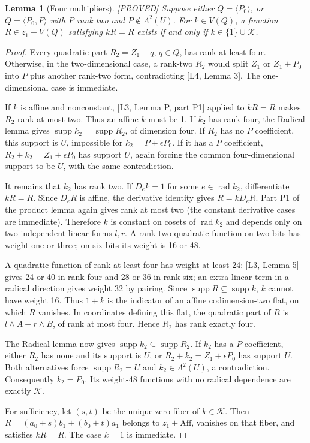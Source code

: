 \documentclass[11pt,a4paper]{article}
\newtheorem{lemma}[theorem]{Lemma}
\newcommand{\Aff}{\mathrm{Aff}}
\newcommand{\supp}{\operatorname{supp}}
\newcommand{\rad}{\operatorname{rad}}
\newcommand{\status}[1]{\hfill\textsf{[#1]}}
\begin{document}
\begin{lemma}[Four multipliers]\label{lem:four}\status{PROVED}
Suppose either $Q=\langle P_0\rangle$, or $Q=\langle P_0,P\rangle$ with $P$ rank two and $P\notin\Lambda^2(U)$. For $k\in V(Q)$, a function $R\in z_1+V(Q)$ satisfying $kR=R$ exists if and only if $k\in\{1\}\cup\mathcal K$.
\end{lemma}
\begin{proof}
Every quadratic part $R_2=Z_1+q$, $q\in Q$, has rank at least four. Otherwise, in the two-dimensional case, a rank-two $R_2$ would split $Z_1$ or $Z_1+P_0$ into $P$ plus another rank-two form, contradicting [L4, Lemma 3]. The one-dimensional case is immediate.

If $k$ is affine and nonconstant, [L3, Lemma P, part P1] applied to $kR=R$ makes $R_2$ rank at most two. Thus an affine $k$ must be 1. If $k_2$ has rank four, the Radical lemma gives $\supp k_2=\supp R_2$, of dimension four. If $R_2$ has no $P$ coefficient, this support is $U$, impossible for $k_2=P+\epsilon P_0$. If it has a $P$ coefficient, $R_2+k_2=Z_1+\epsilon P_0$ has support $U$, again forcing the common four-dimensional support to be $U$, with the same contradiction.

It remains that $k_2$ has rank two. If $D_ek=1$ for some $e\in\rad k_2$, differentiate $kR=R$. Since $D_eR$ is affine, the derivative identity gives $R=kD_eR$. Part P1 of the product lemma again gives rank at most two (the constant derivative cases are immediate). Therefore $k$ is constant on cosets of $\rad k_2$ and depends only on two independent linear forms $l,r$. A rank-two quadratic function on two bits has weight one or three; on six bits its weight is 16 or 48.

A quadratic function of rank at least four has weight at least 24: [L3, Lemma 5] gives 24 or 40 in rank four and 28 or 36 in rank six; an extra linear term in a radical direction gives weight 32 by pairing. Since $\supp R\subseteq\supp k$, $k$ cannot have weight 16. Thus $1+k$ is the indicator of an affine codimension-two flat, on which $R$ vanishes. In coordinates defining this flat, the quadratic part of $R$ is $l\wedge A+r\wedge B$, of rank at most four. Hence $R_2$ has rank exactly four.

The Radical lemma now gives $\supp k_2\subseteq\supp R_2$. If $k_2$ has a $P$ coefficient, either $R_2$ has none and its support is $U$, or $R_2+k_2=Z_1+\epsilon P_0$ has support $U$. Both alternatives force $\supp R_2=U$ and $k_2\in\Lambda^2(U)$, a contradiction. Consequently $k_2=P_0$. Its weight-48 functions with no radical dependence are exactly $\mathcal K$.

For sufficiency, let $(s,t)$ be the unique zero fiber of $k\in\mathcal K$. Then $R=(a_0+s)b_1+(b_0+t)a_1$ belongs to $z_1+\Aff$, vanishes on that fiber, and satisfies $kR=R$. The case $k=1$ is immediate.
\end{proof}
\end{document}
